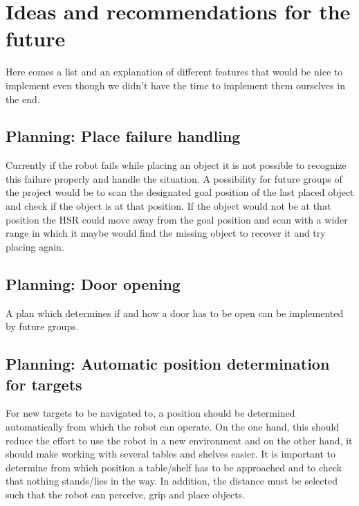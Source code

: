 \documentclass[main.tex]{subfiles}
\begin{document}
	\begingroup

	\renewcommand{\cleardoublepage}{}

	\renewcommand{\clearpage}{}

	\chapter{Ideas and recommendations for the future}
		
		Here comes a list and an explanation of different features that would be nice to implement even though we didn't have the time to implement them ourselves in the end.
		
		\section{Planning: Place failure handling}
		Currently if the robot fails while placing an object it is not possible to recognize this failure properly and handle the situation. A possibility for future groups of the project would be to scan the designated goal position of the last placed object and check if the object is at that position. If the object would not be at that position the HSR could move away from the goal position and scan with a wider range in which it maybe would find the missing object to recover it and try placing again.
		
		\section{Planning: Door opening}
		A plan which determines if and how a door has to be open can be implemented by future groups.
		
		\section{Planning: Automatic position determination for targets}
		For new targets to be navigated to, a position should be determined automatically from which the robot can operate. On the one hand, this should reduce the effort to use the robot in a new environment and on the other hand, it should make working with several tables and shelves easier. It is important to determine from which position a table/shelf has to be approached and to check that nothing stands/lies in the way. In addition, the distance must be selected such that the robot can perceive, grip and place objects.
		
\end{document}
